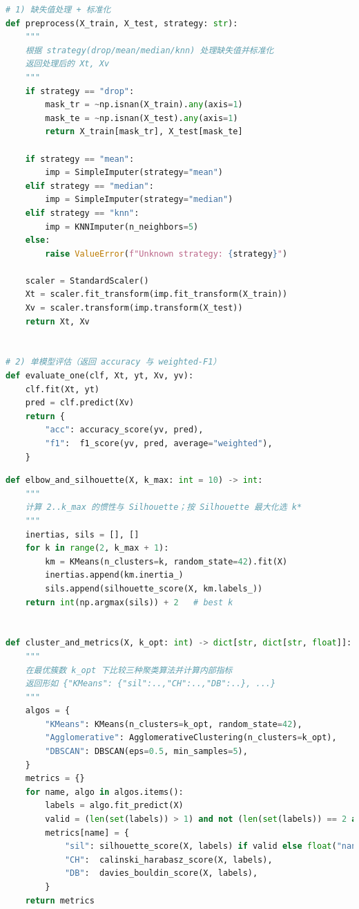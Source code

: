 \documentclass[UTF8]{ctexart}
\begin{document}
\begin{lstlisting}[language=Python, caption={核心算法实现：监督学习模块}]
# 1) 缺失值处理 + 标准化
def preprocess(X_train, X_test, strategy: str):
    """
    根据 strategy(drop/mean/median/knn) 处理缺失值并标准化
    返回处理后的 Xt, Xv
    """
    if strategy == "drop":
        mask_tr = ~np.isnan(X_train).any(axis=1)
        mask_te = ~np.isnan(X_test).any(axis=1)
        return X_train[mask_tr], X_test[mask_te]

    if strategy == "mean":
        imp = SimpleImputer(strategy="mean")
    elif strategy == "median":
        imp = SimpleImputer(strategy="median")
    elif strategy == "knn":
        imp = KNNImputer(n_neighbors=5)
    else:
        raise ValueError(f"Unknown strategy: {strategy}")

    scaler = StandardScaler()
    Xt = scaler.fit_transform(imp.fit_transform(X_train))
    Xv = scaler.transform(imp.transform(X_test))
    return Xt, Xv


# 2) 单模型评估（返回 accuracy 与 weighted-F1）
def evaluate_one(clf, Xt, yt, Xv, yv):
    clf.fit(Xt, yt)
    pred = clf.predict(Xv)
    return {
        "acc": accuracy_score(yv, pred),
        "f1":  f1_score(yv, pred, average="weighted"),
    }
\end{lstlisting}

\begin{lstlisting}[language=Python, caption={核心算法实现：无监督学习模块}]
def elbow_and_silhouette(X, k_max: int = 10) -> int:
    """
    计算 2..k_max 的惯性与 Silhouette；按 Silhouette 最大化选 k*
    """
    inertias, sils = [], []
    for k in range(2, k_max + 1):
        km = KMeans(n_clusters=k, random_state=42).fit(X)
        inertias.append(km.inertia_)
        sils.append(silhouette_score(X, km.labels_))
    return int(np.argmax(sils)) + 2   # best k


def cluster_and_metrics(X, k_opt: int) -> dict[str, dict[str, float]]:
    """
    在最优簇数 k_opt 下比较三种聚类算法并计算内部指标
    返回形如 {"KMeans": {"sil":..,"CH":..,"DB":..}, ...}
    """
    algos = {
        "KMeans": KMeans(n_clusters=k_opt, random_state=42),
        "Agglomerative": AgglomerativeClustering(n_clusters=k_opt),
        "DBSCAN": DBSCAN(eps=0.5, min_samples=5),
    }
    metrics = {}
    for name, algo in algos.items():
        labels = algo.fit_predict(X)
        valid = (len(set(labels)) > 1) and not (len(set(labels)) == 2 and -1 in labels)
        metrics[name] = {
            "sil": silhouette_score(X, labels) if valid else float("nan"),
            "CH":  calinski_harabasz_score(X, labels),
            "DB":  davies_bouldin_score(X, labels),
        }
    return metrics
\end{lstlisting}
\end{document}
